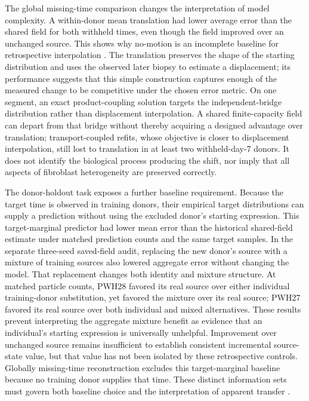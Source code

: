 The global missing-time comparison changes the interpretation of model complexity. A within-donor mean translation had lower average error than the shared field for both withheld times, even though the field improved over an unchanged source. This shows why no-motion is an incomplete baseline for retrospective interpolation \citep{schiebinger2019,tong2020trajectory}. The translation preserves the shape of the starting distribution and uses the observed later biopsy to estimate a displacement; its performance suggests that this simple construction captures enough of the measured change to be competitive under the chosen error metric. On one segment, an exact product-coupling solution targets the independent-bridge distribution rather than displacement interpolation. A shared finite-capacity field can depart from that bridge without thereby acquiring a designed advantage over translation; transport-coupled refits, whose objective is closer to displacement interpolation, still lost to translation in at least two withheld-day-7 donors. It does not identify the biological process producing the shift, nor imply that all aspects of fibroblast heterogeneity are preserved correctly.

The donor-holdout task exposes a further baseline requirement. Because the target time is observed in training donors, their empirical target distributions can supply a prediction without using the excluded donor's starting expression. This target-marginal predictor had lower mean error than the historical shared-field estimate under matched prediction counts and the same target samples. In the separate three-seed saved-field audit, replacing the new donor's source with a mixture of training sources also lowered aggregate error without changing the model. That replacement changes both identity and mixture structure. At matched particle counts, PWH28 favored its real source over either individual training-donor substitution, yet favored the mixture over its real source; PWH27 favored its real source over both individual and mixed alternatives. These results prevent interpreting the aggregate mixture benefit as evidence that an individual's starting expression is universally unhelpful. Improvement over unchanged source remains insufficient to establish consistent incremental source-state value, but that value has not been isolated by these retrospective controls. Globally missing-time reconstruction excludes this target-marginal baseline because no training donor supplies that time. These distinct information sets must govern both baseline choice and the interpretation of apparent transfer \citep{roberts2017,cawley2010}.

